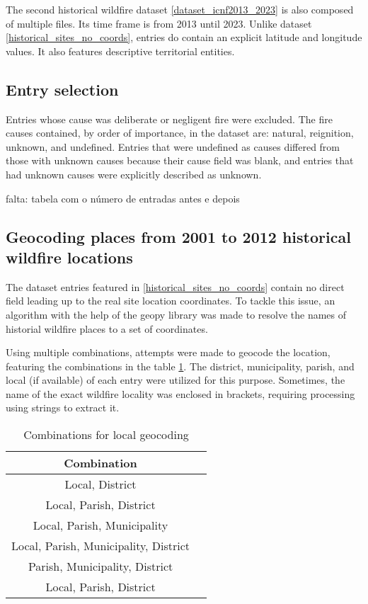 The second historical wildfire dataset \ref{dataset_icnf2013_2023} is also composed of multiple files. Its time frame is from 2013 until 2023. Unlike dataset \ref{historical_sites_no_coords}, entries do contain an explicit latitude and longitude values. It also features descriptive territorial entities. 


\subsection{Entry selection}
Entries whose cause was deliberate or negligent fire were excluded. The fire causes contained, by order of importance, in the dataset are: natural, reignition, unknown, and undefined.
Entries that were undefined as causes differed from those with unknown causes because their cause field was blank, and entries that had unknown causes were explicitly described as unknown.

falta: tabela com o número de entradas antes e depois



\subsection{Geocoding places from 2001 to 2012 historical wildfire locations}
\label{geocoding_historical}
The dataset entries featured in \ref{historical_sites_no_coords} contain no direct field leading up to the real site location coordinates. To tackle this issue, an algorithm with the help of the geopy library \cite{geopy} was made to resolve the names of historial wildfire places to a set of coordinates.


Using multiple combinations, attempts were made to geocode the location, featuring the combinations in the table \ref{geocoding_entries_2001_2012}. The district, municipality, parish, and local (if available) of each entry were utilized for this purpose. Sometimes, the name of the exact wildfire locality was enclosed in brackets, requiring processing using strings to extract it.



\begin{table}[h!]
	\caption{Combinations for local geocoding}
	\label{geocoding_entries_2001_2012}
	\centering
	\small
	\begin{tabular}{|c|p{7.5cm}|} %
		\hline
		\textbf{Combination}\\
		\hline
		Local, District\\
		\hline
		Local, Parish, District\\
		\hline
		Local, Parish, Municipality\\
		\hline
		Local, Parish, Municipality, District\\
		\hline
		Parish, Municipality, District\\
		\hline
		Local, Parish, District\\
		\hline
	\end{tabular}
\end{table}


